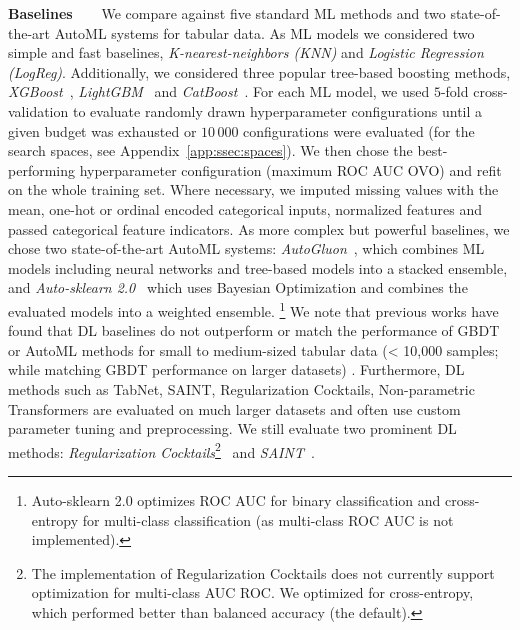 \textbf{Baselines~~~} We compare against five standard ML methods and two state-of-the-art AutoML systems for tabular data. As ML models we considered two simple and fast baselines, \textit{K-nearest-neighbors (KNN)} and \textit{Logistic Regression (LogReg)}. Additionally, we considered three popular tree-based boosting methods, \textit{XGBoost}~\citep{chen-arxiv20a}, \textit{LightGBM}~\citep{ke-neurips17a} and \textit{CatBoost}~\citep{prokhorenkova-neurips18a}.
For each ML model, we used $5$-fold cross-validation to evaluate randomly drawn hyperparameter configurations until a given budget was exhausted or $10\,000$ configurations were evaluated (for the search spaces, see Appendix~\ref{app:ssec:spaces}).
We then chose the best-performing hyperparameter configuration (maximum ROC AUC OVO) and refit on the whole training set. Where necessary, we imputed missing values with the mean, one-hot or ordinal encoded categorical inputs, normalized features and passed categorical feature indicators. As more complex but powerful baselines, we chose two state-of-the-art AutoML systems: \textit{AutoGluon}~\citep{erickson-arxiv20a}, which combines ML models including neural networks and tree-based models into a stacked ensemble, and \textit{Auto-sklearn 2.0}~\citep{feurer-nips15a,feurer-arxiv20v2} which uses Bayesian Optimization and combines the evaluated models into a weighted ensemble.
\footnote{Auto-sklearn 2.0 optimizes ROC AUC for binary classification and cross-entropy for multi-class classification (as multi-class ROC AUC is not implemented).

} We note that previous works have found that DL baselines do not outperform or match the performance of GBDT or AutoML methods for small to medium-sized tabular data (< 10,000 samples; while matching GBDT performance on larger datasets) \citep{nnsfortabular,grinsztajn2022why,nnsfortabular2}. Furthermore, DL methods such as TabNet, SAINT, Regularization Cocktails, Non-parametric Transformers \citep{arik2021tabnet, somepalli2021saint, regcocktail, kossen2021self} are evaluated on much larger datasets and often use custom parameter tuning and preprocessing. We still evaluate two prominent DL methods: \textit{Regularization Cocktails}\footnote{The implementation of Regularization Cocktails does not currently support optimization for multi-class AUC ROC. We optimized for cross-entropy, which performed better than balanced accuracy (the default).}~\citep{regcocktail} and \textit{SAINT}~\citep{somepalli2021saint}.

